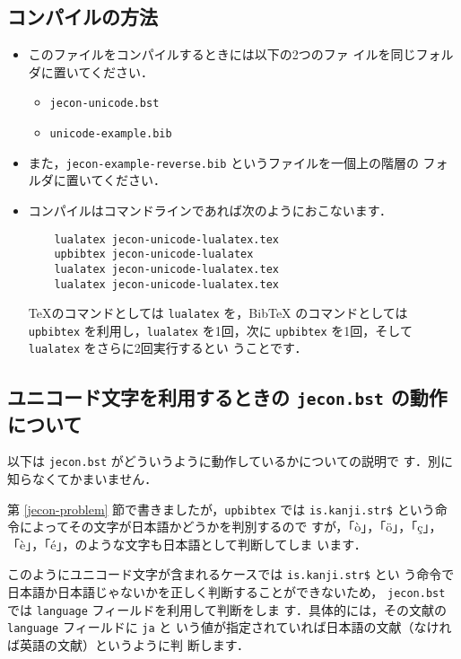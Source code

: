 \documentclass{ltjsarticle}
\begin{document}
\subsection{コンパイルの方法}

\begin{itemize}
 \item このファイルをコンパイルするときには以下の2つのファ
       イルを同じフォルダに置いてください．
       \begin{itemize}
        \item \texttt{jecon-unicode.bst}
        \item \texttt{unicode-example.bib}
       \end{itemize}
 \item また，\texttt{jecon-example-reverse.bib} というファイルを一個上の階層の
       フォルダに置いてください．
 \item コンパイルはコマンドラインであれば次のようにおこないます．
\begin{verbatim}
    lualatex jecon-unicode-lualatex.tex
    upbibtex jecon-unicode-lualatex
    lualatex jecon-unicode-lualatex.tex               
    lualatex jecon-unicode-lualatex.tex
\end{verbatim}
       \TeX のコマンドとしては \texttt{lualatex} を，BibTeX のコマンドとしては
       \texttt{upbibtex} を利用し，\texttt{lualatex} を1回，次に
       \texttt{upbibtex} を1回，そして \texttt{lualatex} をさらに2回実行するとい
       うことです．
\end{itemize}

\subsection{ユニコード文字を利用するときの \texttt{jecon.bst} の動作について}

以下は \texttt{jecon.bst} がどういうように動作しているかについての説明で
す．別に知らなくてかまいません．

\vspace*{1em}

第 \ref{jecon-problem} 節で書きましたが，\texttt{upbibtex} では
\texttt{is.kanji.str\$} という命令によってその文字が日本語かどうかを判別するので
すが，「ò」，「ö」，「ç」，「è」，「é」，のような文字も日本語として判断してしま
います．

このようにユニコード文字が含まれるケースでは \texttt{is.kanji.str\$} とい
う命令で日本語か日本語じゃないかを正しく判断することができないため，
\texttt{jecon.bst} では \texttt{language} フィールドを利用して判断をしま
す．具体的には，その文献の \texttt{language} フィールドに \texttt{ja} と
いう値が指定されていれば日本語の文献（なければ英語の文献）というように判
断します．
\end{document}
